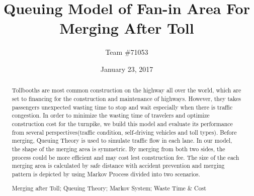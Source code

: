 \documentclass[a4paper, 11pt]{article}
\title{Queuing Model of Fan-in Area For Merging After Toll}
\author{Team \#71053}
\date{January 23, 2017}
\begin{document}
\begin{abstract}
Tollbooths are most common construction on the highway all over the world, which are set to financing for the construction and maintenance of highways. However, they takes passengers unexpected wasting time to stop and wait especially when there is traffic congestion. In order to minimize the wasting time of travelers and optimize construction cost for the turnpike, we build this model and evaluate its performance from several perspectives(traffic condition, self-driving vehicles and toll types). Before merging, Queuing Theory is used to simulate traffic flow in each lane. In our model, the shape of the merging area is symmetric. By merging from both two sides, the process could be more efficient and may cost lest construction fee. The size of the each merging area is calculated by safe distance with accident prevention and merging pattern is depicted by using Markov Process divided into two scenarios.

\begin{keywords}
Merging after Toll; Queuing Theory; Markov System; Waste Time \& Cost
\end{keywords}

\end{abstract}

\maketitle
\pagestyle{empty}
\newpage
\tableofcontents

\pagestyle{fancy}

\end{document}
